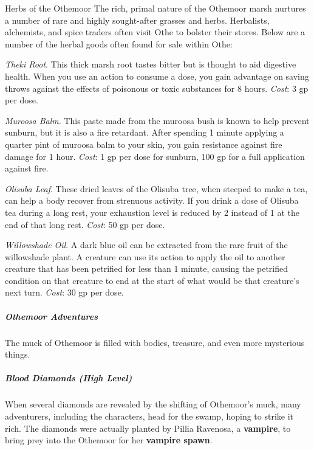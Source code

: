 \documentclass[10pt,a4paper,twoside,bg=print,twocolumn,openany,nodeprecatedcode]{dndbook}
\begin{document}
\begin{DndSidebar}[float=!b]{Herbs of the Othemoor}
The rich, primal nature of the Othemoor marsh nurtures a number of rare and highly sought-after grasses and herbs. Herbalists, alchemists, and spice traders often visit Othe to bolster their stores. Below are a number of the herbal goods often found for sale within Othe:



\textit{Theki Root}. This thick marsh root tastes bitter but is thought to aid digestive health. When you use an action to consume a dose, you gain advantage on saving throws against the effects of poisonous or toxic substances for 8 hours. \textit{Cost}: 3 gp per dose.



\textit{Muroosa Balm}. This paste made from the muroosa bush is known to help prevent sunburn, but it is also a fire retardant. After spending 1 minute applying a quarter pint of muroosa balm to your skin, you gain resistance against fire damage for 1 hour. \textit{Cost}: 1 gp per dose for sunburn, 100 gp for a full application against fire.



\textit{Olisuba Leaf}. These dried leaves of the Olisuba tree, when steeped to make a tea, can help a body recover from strenuous activity. If you drink a dose of Olisuba tea during a long rest, your exhaustion level is reduced by 2 instead of 1 at the end of that long rest. \textit{Cost}: 50 gp per dose.



\textit{Willowshade Oil}. A dark blue oil can be extracted from the rare fruit of the willowshade plant. A creature can use its action to apply the oil to another creature that has been petrified for less than 1 minute, causing the petrified condition on that creature to end at the start of what would be that creature's next turn. \textit{Cost}: 30 gp per dose.



\end{DndSidebar}

\subparagraph{Othemoor Adventures}
The muck of Othemoor is filled with bodies, treasure, and even more mysterious things.

\subparagraph{Blood Diamonds (High Level)}
When several diamonds are revealed by the shifting of Othemoor's muck, many adventurers, including the characters, head for the swamp, hoping to strike it rich. The diamonds were actually planted by Pillia Ravenosa, a \textbf{vampire}, to bring prey into the Othemoor for her \textbf{vampire spawn}.
\end{document}
